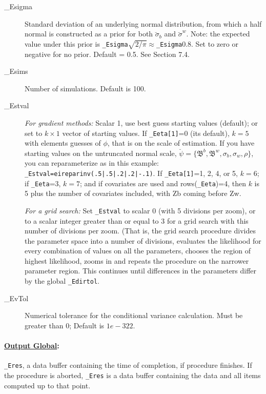 \documentclass[11pt,titlepage]{article}
\newcommand{\bbeta}{{\mathfrak B}}
\newcommand{\sigmau}{\breve{\sigma}}
\newcommand{\psiu}{\breve{\psi}}
\begin{document}
\begin{description}
\item[\_Esigma] Standard deviation of an underlying normal
  distribution, from which a half normal is constructed as a prior for
  both $\sigmau_b$ and $\sigmau^w$.  Note: the expected value under
  this prior is \texttt{\_Esigma}$\sqrt{2/\pi}
  \approx$\texttt{\_Esigma}0.8.  Set to zero or negative for no prior.
  Default = 0.5.  See Section 7.4.

\item[\_Esims] Number of simulations. Default is 100.

\item[\_Estval] \emph{For gradient methods:} Scalar 1, use best guess
  starting values (default); or set to $k\times 1$ vector of starting
  values.  If \texttt{\_Eeta[1]}=0 (its default), $k=5$ with elements
  guesses of $\phi$, that is on the scale of estimation.  If you have
  starting values on the untruncated normal scale,
  $\psiu=\{\bbeta^b,\bbeta^w,\sigma_b,\sigma_w,\rho\}$, you can
  reparameterize as in this example:
  \texttt{\_Estval=eireparinv(.5|.5|.2|.2|-.1)}.  If
  \texttt{\_Eeta[1]}=1, 2, 4, or 5, $k=6$; if \texttt{\_Eeta}=3,
  $k=7$; and if covariates are used and rows(\texttt{\_Eeta})=4, then
  $k$ is 5 plus the number of covariates included, with Zb coming
  before Zw.

  \emph{For a grid search:} Set \texttt{\_Estval} to scalar 0 (with 5
  divisions per zoom), or to a scalar integer greater than or equal to
  3 for a grid search with this number of divisions per zoom.  (That
  is, the grid search procedure divides the parameter space into a
  number of divisions, evaluates the likelihood for every combination
  of values on all the parameters, chooses the region of highest
  likelihood, zooms in and repeats the procedure on the narrower
  parameter region.  This continues until differences in the
  parameters differ by the global \texttt{\_Edirtol}.

\item[\_EvTol] Numerical tolerance for the conditional variance
  calculation.  Must be greater than 0; Default is $1e-322$.
\end{description}

\paragraph{\underline{Output Global}:}
\texttt{\_Eres}, a data buffer containing the time of completion, if
procedure finishes.  If the procedure is aborted, \texttt{\_Eres} is a
data buffer containing the data and all items computed up to that
point.
\end{document}
